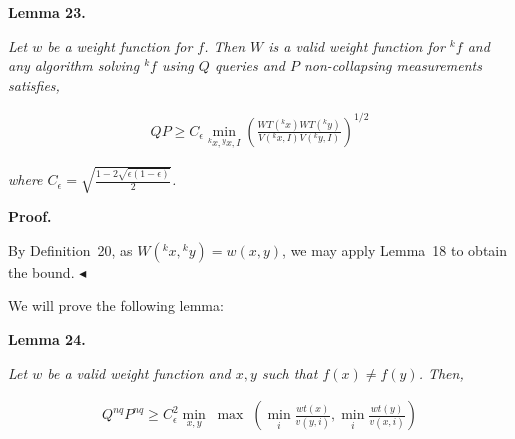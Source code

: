 \documentclass[10pt,a4paper]{article}
\begin{document}


\par\medskip\noindent\textbf{
\textbf{Lemma 23}\textbf{.}
}\par



\emph{Let $w$ be a weight function for $f$. Then $W$ is a valid weight function for ${}^{k}f$ and any algorithm solving ${}^{k}f$ using $Q$ queries and $P$ non-collapsing measurements satisfies,}\par


\[\begin{gathered}
\displaystyle QP\geq C_{\epsilon}\min_{{}^{k}x,{}^{y}x,I}\left(\frac{WT({}^{k}x)WT({}^{k}y)}{V({}^{k}x,I)V({}^{k}y,I)}\right)^{1/2}
\end{gathered}\]


\emph{where $C_{\epsilon}=\sqrt{\frac{1-2\sqrt{\epsilon(1-\epsilon)}}{2}}$.}\par






\par\medskip\noindent\textbf{Proof.}\par




By Definition 20, as $W({}^{k}x,{}^{k}y)=w(x,y)$, we may apply Lemma 18 to obtain the bound.
$\blacktriangleleft$\par




We will prove the following lemma:\par






\par\medskip\noindent\textbf{
\textbf{Lemma 24}\textbf{.}
}\par



\emph{Let $w$ be a valid weight function and $x,y$ such that $f(x)\neq f(y)$. Then,}\par


\[\begin{gathered}
\displaystyle Q^{nq}P^{nq}\geq C^{2}_{\epsilon}\min_{x,y}\;\max\;\left(\min_{i}\frac{wt(x)}{v(y,i)},\min_{i}\frac{wt(y)}{v(x,i)}\right)
\end{gathered}\]



\end{document}
